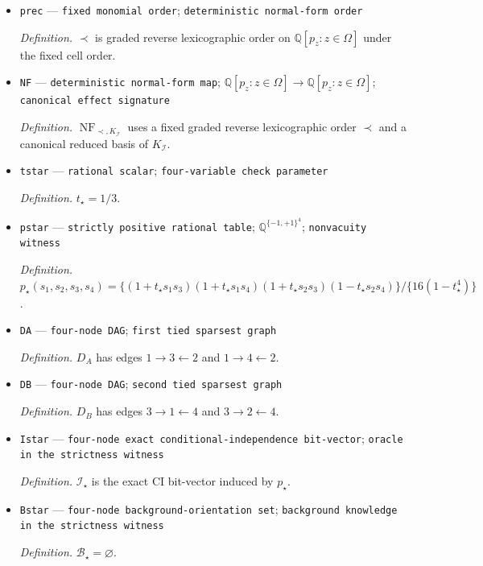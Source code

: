 \documentclass{article}
\begin{document}
\begin{itemize}
  \item \texttt{prec} --- \texttt{fixed monomial order}; \texttt{deterministic normal-\allowbreak{}form order}
  \par\smallskip\noindent\emph{Definition.} \(\prec\) is graded reverse lexicographic order on \(\mathbb Q[p_z:z\in\Omega]\) under the fixed cell order.
  \item \texttt{NF} --- \texttt{deterministic normal-\allowbreak{}form map}; \(\mathbb Q[p_z:z\in\Omega]\to\mathbb Q[p_z:z\in\Omega]\); \texttt{canonical effect signature}
  \par\smallskip\noindent\emph{Definition.} \(\operatorname{NF}_{\prec,K_{\mathcal I}}\) uses a fixed graded reverse lexicographic order \(\prec\) and a canonical reduced basis of \(K_{\mathcal I}\).
  \item \texttt{tstar} --- \texttt{rational scalar}; \texttt{four-\allowbreak{}variable check parameter}
  \par\smallskip\noindent\emph{Definition.} \(t_{\star}=1/3\).
  \item \texttt{pstar} --- \texttt{strictly positive rational table}; \(\mathbb Q^{\{-1,+1\}^4}\); \texttt{nonvacuity witness}
  \par\smallskip\noindent\emph{Definition.} \(p_{\star}(s_1,s_2,s_3,s_4)=\{(1+t_{\star}s_1s_3)(1+t_{\star}s_1s_4)(1+t_{\star}s_2s_3)(1-t_{\star}s_2s_4)\}/\{16(1-t_{\star}^4)\}\).
  \item \texttt{DA} --- \texttt{four-\allowbreak{}node DAG}; \texttt{first tied sparsest graph}
  \par\smallskip\noindent\emph{Definition.} \(D_A\) has edges \(1\to3\leftarrow2\) and \(1\to4\leftarrow2\).
  \item \texttt{DB} --- \texttt{four-\allowbreak{}node DAG}; \texttt{second tied sparsest graph}
  \par\smallskip\noindent\emph{Definition.} \(D_B\) has edges \(3\to1\leftarrow4\) and \(3\to2\leftarrow4\).
  \item \texttt{Istar} --- \texttt{four-\allowbreak{}node exact conditional-\allowbreak{}independence bit-\allowbreak{}vector}; \texttt{oracle in the strictness witness}
  \par\smallskip\noindent\emph{Definition.} \(\mathcal I_{\star}\) is the exact CI bit-vector induced by \(p_{\star}\).
  \item \texttt{Bstar} --- \texttt{four-\allowbreak{}node background-\allowbreak{}orientation set}; \texttt{background knowledge in the strictness witness}
  \par\smallskip\noindent\emph{Definition.} \(\mathcal B_{\star}=\varnothing\).

\end{itemize}
\end{document}
